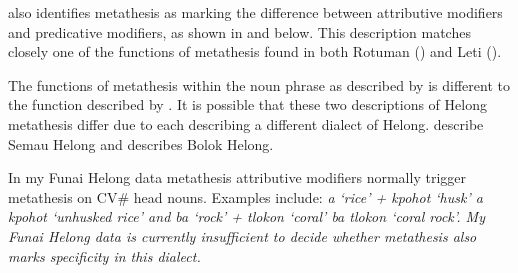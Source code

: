 \begin{exe}
	\label{ex:N+adj->Nm adj}
\end{exe}

\citeauthor{st96b} also identifies metathesis as marking the
difference between attributive modifiers and predicative modifiers,
as shown in  and  below.
This description matches closely one of the functions of metathesis
found in both Rotuman () and Leti ().

\begin{exe}\let\eachwordone=\textnormal
	\ex{\gll [\sub{NP} {\it{le\tbr{lo}} ] [\sub{PRED}} \it{deneʔ} ] \\
						{} sun{\tbrU} go.down \\
			\glt \lh{[\sub{NP} }`The sun sets.' }\label{ex:LeloDeneq}
	\ex{\gll [\sub{NP} \it{le\tbr{ol}} \it{deneʔ} ] \\
						{} sun{\tbrM} go.down\\
			\glt \lh{[\sub{NP} }`west' \hfill\citep[477]{st96b}}\label{ex:LeolDeneq}
\end{exe}

The functions of metathesis within the noun phrase as described by
\cite{st96b} is different to the function described by \cite{baca12}.
It is possible that these two descriptions
of Helong metathesis differ due to each describing
a different dialect of Helong.
\cite{baca12} describe Semau Helong
and \cite{st96b} describes Bolok Helong.

In my Funai Helong data metathesis
attributive modifiers normally trigger metathesis on CV{\#} head nouns.
Examples include: \it{a} `rice' + \it{kpohot} `husk'
{\ra} \it{a kpohot} `unhusked rice' and
\it{ba} `rock' + \it{tlokon} `coral' {\ra}
\it{ba tlokon} `coral rock'.
My Funai Helong data is currently insufficient to
decide whether metathesis also marks specificity in this dialect.

